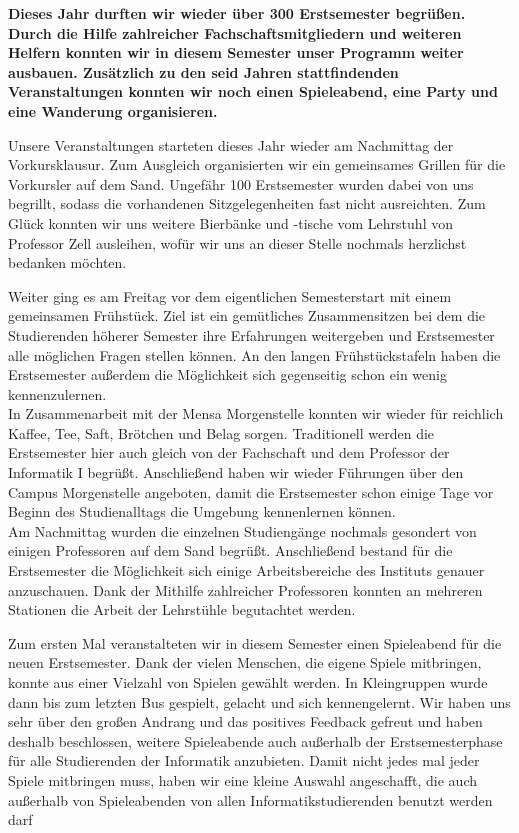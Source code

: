 \textbf{Dieses Jahr durften wir wieder über 300 Erstsemester begrüßen. Durch die Hilfe zahlreicher Fachschaftsmitgliedern und weiteren Helfern konnten wir in diesem Semester unser Programm weiter ausbauen. Zusätzlich zu den seid Jahren stattfindenden Veranstaltungen konnten wir noch einen Spieleabend, eine Party und eine Wanderung organisieren.}
%

Unsere Veranstaltungen starteten dieses Jahr wieder am Nachmittag der Vorkursklausur. Zum Ausgleich organisierten wir ein gemeinsames Grillen für die Vorkursler auf dem Sand. Ungefähr 100 Erstsemester wurden dabei von uns begrillt, sodass die vorhandenen Sitzgelegenheiten fast nicht ausreichten. Zum Glück konnten wir uns weitere Bierbänke und -tische vom Lehrstuhl von Professor Zell ausleihen, wofür wir uns an dieser Stelle nochmals herzlichst bedanken möchten.

Weiter ging es am Freitag vor dem eigentlichen Semesterstart mit einem gemeinsamen Frühstück. Ziel ist ein gemütliches Zusammensitzen bei dem die Studierenden höherer Semester ihre Erfahrungen weitergeben und Erstsemester alle möglichen Fragen stellen können. An den langen Frühstückstafeln haben die Erstsemester außerdem die Möglichkeit sich gegenseitig schon ein wenig kennenzulernen.\\
In Zusammenarbeit mit der Mensa Morgenstelle konnten wir wieder für reichlich Kaffee, Tee, Saft, Brötchen und Belag sorgen. Traditionell werden die Erstsemester hier auch gleich von der Fachschaft und dem Professor der Informatik I begrüßt. Anschließend haben wir wieder Führungen über den Campus Morgenstelle angeboten, damit die Erstsemester schon einige Tage vor Beginn des Studienalltags die Umgebung kennenlernen können.\\
Am Nachmittag wurden die einzelnen Studiengänge nochmals gesondert von einigen Professoren auf dem Sand begrüßt. Anschließend bestand für die Erstsemester die Möglichkeit sich einige Arbeitsbereiche des Instituts genauer anzuschauen. Dank der Mithilfe zahlreicher Professoren konnten an mehreren Stationen die Arbeit der Lehrstühle begutachtet werden.
%
%
%

Zum ersten Mal veranstalteten wir in diesem Semester einen Spieleabend für die neuen Erstsemester. Dank der vielen Menschen, die eigene Spiele mitbringen, konnte aus einer Vielzahl von Spielen gewählt werden. In Kleingruppen wurde dann bis zum letzten Bus gespielt, gelacht und sich kennengelernt. Wir haben uns sehr über den großen Andrang und das positives Feedback gefreut und haben deshalb beschlossen, weitere Spieleabende auch außerhalb der Erstsemesterphase für alle Studierenden der Informatik anzubieten. Damit nicht jedes mal jeder Spiele mitbringen muss, haben wir eine kleine Auswahl angeschafft, die auch außerhalb von Spieleabenden von allen Informatikstudierenden benutzt werden darf

